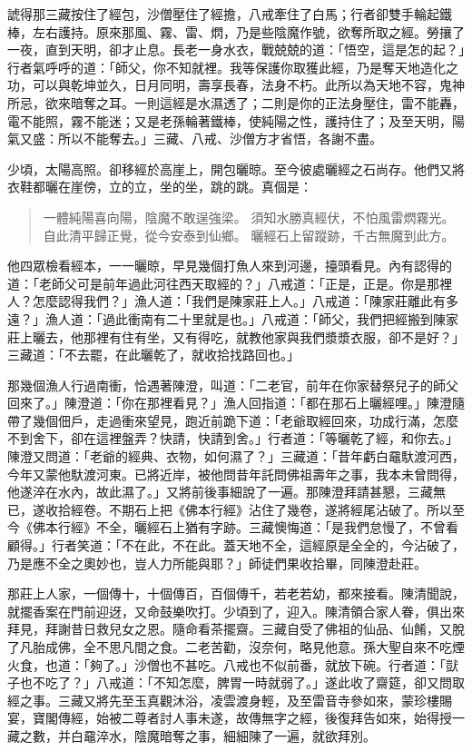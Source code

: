 諕得那三藏按住了經包，沙僧壓住了經擔，八戒牽住了白馬；行者卻雙手輪起鐵棒，左右護持。原來那風、霧、雷、熌，乃是些陰魔作號，欲奪所取之經。勞攘了一夜，直到天明，卻才止息。長老一身水衣，戰兢兢的道：「悟空，這是怎的起？」行者氣呼呼的道：「師父，你不知就裡。我等保護你取獲此經，乃是奪天地造化之功，可以與乾坤並久，日月同明，壽享長春，法身不朽。此所以為天地不容，鬼神所忌，欲來暗奪之耳。一則這經是水濕透了；二則是你的正法身壓住，雷不能轟，電不能照，霧不能迷；又是老孫輪著鐵棒，使純陽之性，護持住了；及至天明，陽氣又盛：所以不能奪去。」三藏、八戒、沙僧方才省悟，各謝不盡。

少頃，太陽高照。卻移經於高崖上，開包曬晾。至今彼處曬經之石尚存。他們又將衣鞋都曬在崖傍，立的立，坐的坐，跳的跳。真個是：
\begin{quote}
一體純陽喜向陽，陰魔不敢逞強梁。
須知水勝真經伏，不怕風雷熌霧光。
自此清平歸正覺，從今安泰到仙鄉。
曬經石上留蹤跡，千古無魔到此方。
\end{quote}

他四眾檢看經本，一一曬晾，早見幾個打魚人來到河邊，擡頭看見。內有認得的道：「老師父可是前年過此河往西天取經的？」八戒道：「正是，正是。你是那裡人？怎麼認得我們？」漁人道：「我們是陳家莊上人。」八戒道：「陳家莊離此有多遠？」漁人道：「過此衝南有二十里就是也。」八戒道：「師父，我們把經搬到陳家莊上曬去，他那裡有住有坐，又有得吃，就教他家與我們漿漿衣服，卻不是好？」三藏道：「不去罷，在此曬乾了，就收拾找路回也。」

那幾個漁人行過南衝，恰遇著陳澄，叫道：「二老官，前年在你家替祭兒子的師父回來了。」陳澄道：「你在那裡看見？」漁人回指道：「都在那石上曬經哩。」陳澄隨帶了幾個佃戶，走過衝來望見，跑近前跪下道：「老爺取經回來，功成行滿，怎麼不到舍下，卻在這裡盤弄？快請，快請到舍。」行者道：「等曬乾了經，和你去。」陳澄又問道：「老爺的經典、衣物，如何濕了？」三藏道：「昔年虧白黿馱渡河西，今年又蒙他馱渡河東。已將近岸，被他問昔年託問佛祖壽年之事，我本未曾問得，他遂淬在水內，故此濕了。」又將前後事細說了一遍。那陳澄拜請甚懇，三藏無已，遂收拾經卷。不期石上把《佛本行經》沾住了幾卷，遂將經尾沾破了。所以至今《佛本行經》不全，曬經石上猶有字跡。三藏懊悔道：「是我們怠慢了，不曾看顧得。」行者笑道：「不在此，不在此。蓋天地不全，這經原是全全的，今沾破了，乃是應不全之奧妙也，豈人力所能與耶？」師徒們果收拾畢，同陳澄赴莊。

那莊上人家，一個傳十，十個傳百，百個傳千，若老若幼，都來接看。陳清聞說，就擺香案在門前迎迓，又命鼓樂吹打。少頃到了，迎入。陳清領合家人眷，俱出來拜見，拜謝昔日救兒女之恩。隨命看茶擺齋。三藏自受了佛祖的仙品、仙餚，又脫了凡胎成佛，全不思凡間之食。二老苦勸，沒奈何，略見他意。孫大聖自來不吃煙火食，也道：「夠了。」沙僧也不甚吃。八戒也不似前番，就放下碗。行者道：「獃子也不吃了？」八戒道：「不知怎麼，脾胃一時就弱了。」遂此收了齋筵，卻又問取經之事。三藏又將先至玉真觀沐浴，凌雲渡身輕，及至雷音寺參如來，蒙珍樓賜宴，寶閣傳經，始被二尊者討人事未遂，故傳無字之經，後復拜告如來，始得授一藏之數，并白黿淬水，陰魔暗奪之事，細細陳了一遍，就欲拜別。

